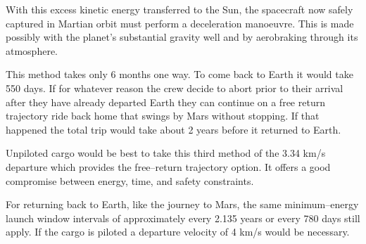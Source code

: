 With this excess kinetic energy transferred to the Sun, the spacecraft now safely captured in Martian orbit must perform a deceleration manoeuvre. This is made possibly with the planet's substantial gravity well and by aerobraking through its atmosphere. 

This method takes only 6 months one way. To come back to Earth it would take 550 days. If for whatever reason the crew decide to abort prior to their arrival after they have already departed Earth they can continue on a free return trajectory ride back home that swings by Mars without stopping. If that happened the total trip would take about 2 years before it returned to Earth.

Unpiloted cargo would be best to take this third method of the 3.34 km/s departure which provides the free--return trajectory option. It offers a good compromise between energy, time, and safety constraints.

For returning back to Earth, like the journey to Mars, the same minimum--energy launch window intervals of approximately every 2.135 years or every 780 days still apply. If the cargo is piloted a departure velocity of 4 km/s would be necessary.

